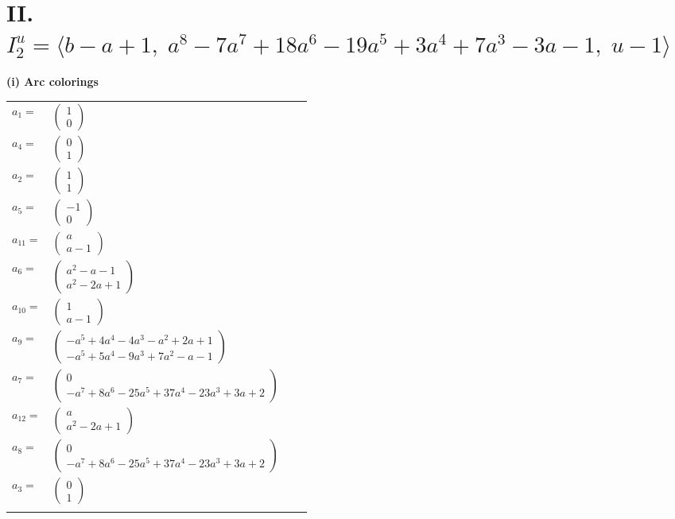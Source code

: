 \documentclass[1p]{elsarticle_modified}
\theoremstyle{definition}
\begin{document}
\centering \section*{II. $I^u_{2}= \langle b- a+1,\;a^8-7 a^7+18 a^6-19 a^5+3 a^4+7 a^3-3 a-1,\;u-1 \rangle$}
\flushleft \textbf{(i) Arc colorings}\\
\begin{tabular}{m{7pt} m{180pt} m{7pt} m{180pt} }
\flushright $a_{1}=$&$\begin{pmatrix}1\\0\end{pmatrix}$ \\
\flushright $a_{4}=$&$\begin{pmatrix}0\\1\end{pmatrix}$ \\
\flushright $a_{2}=$&$\begin{pmatrix}1\\1\end{pmatrix}$ \\
\flushright $a_{5}=$&$\begin{pmatrix}-1\\0\end{pmatrix}$ \\
\flushright $a_{11}=$&$\begin{pmatrix}a\\a-1\end{pmatrix}$ \\
\flushright $a_{6}=$&$\begin{pmatrix}a^2- a-1\\a^2-2 a+1\end{pmatrix}$ \\
\flushright $a_{10}=$&$\begin{pmatrix}1\\a-1\end{pmatrix}$ \\
\flushright $a_{9}=$&$\begin{pmatrix}- a^5+4 a^4-4 a^3- a^2+2 a+1\\- a^5+5 a^4-9 a^3+7 a^2- a-1\end{pmatrix}$ \\
\flushright $a_{7}=$&$\begin{pmatrix}0\\- a^7+8 a^6-25 a^5+37 a^4-23 a^3+3 a+2\end{pmatrix}$ \\
\flushright $a_{12}=$&$\begin{pmatrix}a\\a^2-2 a+1\end{pmatrix}$ \\
\flushright $a_{8}=$&$\begin{pmatrix}0\\- a^7+8 a^6-25 a^5+37 a^4-23 a^3+3 a+2\end{pmatrix}$ \\
\flushright $a_{3}=$&$\begin{pmatrix}0\\1\end{pmatrix}$\\&\end{tabular}
\end{document}
